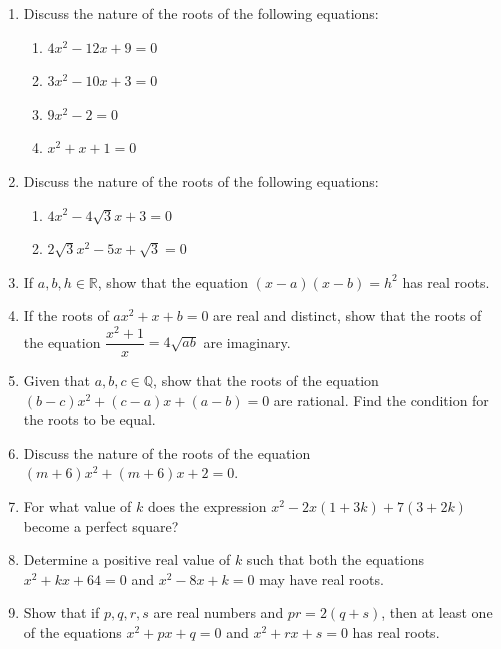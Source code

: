 \documentclass[12pt,a4paper]{article}
\begin{document}
\begin{enumerate}[label=Example \arabic*.]
    \item Discuss the nature of the roots of the following equations:
    \begin{enumerate}[label=(\roman*)]
        \item \( 4x^2 - 12x + 9 = 0 \)
        \item \( 3x^2 - 10x + 3 = 0 \)
        \item \( 9x^2 - 2 = 0 \)
        \item \( x^2 + x + 1 = 0 \)
    \end{enumerate}

    \item Discuss the nature of the roots of the following equations:
    \begin{enumerate}[label=(\roman*)]
        \item \( 4x^2 - 4\sqrt{3}x + 3 = 0 \)
        \item \( 2\sqrt{3}x^2 - 5x + \sqrt{3} = 0 \)
    \end{enumerate}

    \item If \( a, b, h \in \mathbb{R} \), show that the equation \( (x - a)(x - b) = h^2 \) has real roots.

    \item If the roots of \( ax^2 + x + b = 0 \) are real and distinct, show that the roots of the equation \( \dfrac{x^2 + 1}{x} = 4\sqrt{ab} \) are imaginary.

    \item Given that \( a, b, c \in \mathbb{Q} \), show that the roots of the equation \( (b - c)x^2 + (c - a)x + (a - b) = 0 \) are rational. Find the condition for the roots to be equal.

    \item Discuss the nature of the roots of the equation \( (m + 6)x^2 + (m + 6)x + 2 = 0 \).

    \item For what value of \( k \) does the expression \( x^2 - 2x(1 + 3k) + 7(3 + 2k) \) become a perfect square?

    \item Determine a positive real value of \( k \) such that both the equations \( x^2 + kx + 64 = 0 \) and \( x^2 - 8x + k = 0 \) may have real roots.

    \item Show that if \( p, q, r, s \) are real numbers and \( pr = 2(q + s) \), then at least one of the equations \( x^2 + px + q = 0 \) and \( x^2 + rx + s = 0 \) has real roots.
\end{enumerate}
\end{document}
